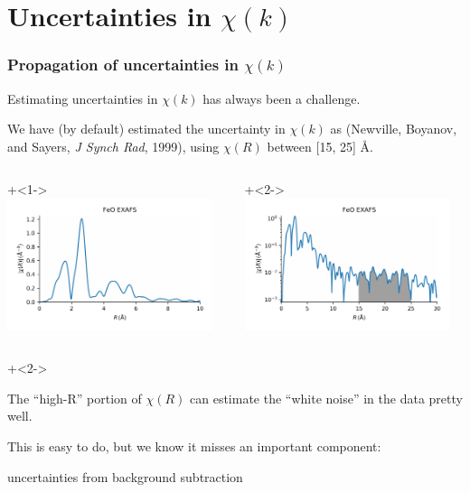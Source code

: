 \section{Uncertainties in $\chi(k)$}
\begin{frame}\frametitle{Propagation of uncertainties in $\chi(k)$}

\begin{cenpage}{95mm}

  Estimating uncertainties in  $\chi(k)$ has always been a challenge.

  \vmm

  We have (by default) estimated the uncertainty in $\chi(k)$ as
  {} {\tiny{(Newville, Boyanov, and Sayers, {\emph{J
          Synch Rad}}, 1999)}}, using $\chi(R)$ between [15, 25] \AA.

\end{cenpage}

\begin{columns}
  \begin{column}[T]{60mm}

    {\onslide+<1->  \includegraphics[width=60mm]{figs/errors/feo_chir}  }


  \end{column}
  \begin{column}[T]{60mm}

    {\onslide+<2-> \includegraphics[width=60mm]{figs/errors/feo_chir_logscale} }

  \end{column}
\end{columns}

{\onslide+<2->

  \begin{cenpage}{105mm}


    The ``high-R'' portion of $\chi(R)$ can estimate the
    ``white noise'' in the data pretty well.

    \vmm
    This is easy to do, but we know it misses an important component:
  \end{cenpage}


  \begin{postitbox}{63mm}
      {uncertainties from  background subtraction}
  \end{postitbox}

}

\end{frame}


